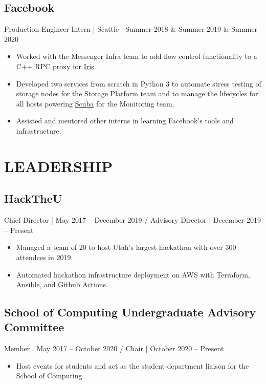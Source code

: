 \documentclass[10pt, letterpaper]{resume}
\begin{document}
\subsection{Facebook}
Production Engineer Intern | Seattle | Summer 2018 \& Summer 2019 \& Summer 2020
\begin{itemize}
    \item Worked with the Messenger Infra team to add flow control functionality to a C++ RPC proxy for \href{https://engineering.fb.com/production-engineering/building-mobile-first-infrastructure-for-messenger/}{Iris}.
 \item Developed two services from scratch in Python 3 to automate stress testing of storage nodes for the Storage Platform team and to manage the lifecycles for all hosts powering \href{https://research.fb.com/wp-content/uploads/2016/11/scuba-diving-into-data-at-facebook.pdf}{Scuba} for the Monitoring team.
 \item Assisted and mentored other interns in learning Facebook's tools and infrastructure.
\end{itemize}

\section{LEADERSHIP}
\subsection{HackTheU}
Chief Director | May 2017 -- December 2019 / Advisory Director | December 2019 -- Present

\begin{itemize}
  \item Managed a team of 20 to host Utah’s largest hackathon with over 300 attendees in 2019.
  \item Automated hackathon infrastructure deployment on AWS with Terraform, Ansible, and Github Actions.
\end{itemize}

\subsection{School of Computing Undergraduate Advisory Committee}
Member | May 2017 -- October 2020 / Chair | October 2020 -- Present
\begin{itemize}
  \item Host events for students and act as the student-department liaison for the School of Computing.
\end{itemize}
\end{document}
